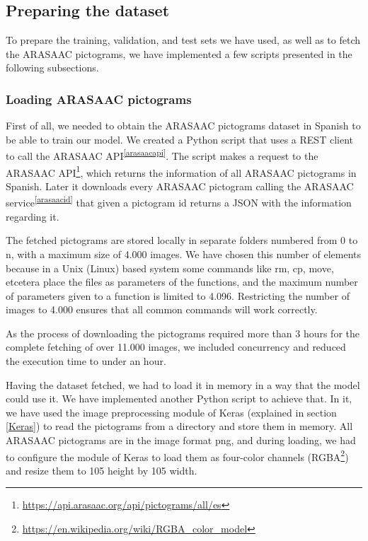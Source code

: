 \subsection{Preparing the dataset}
\label{Preparing the dataset}

To prepare the training, validation, and test sets we have used, as well as to fetch the ARASAAC pictograms, we have implemented a few scripts presented in the following subsections.

\subsubsection{Loading ARASAAC pictograms}
\label{Loading ARASAAC pictograms}

First of all, we needed to obtain the ARASAAC pictograms dataset in Spanish to be able to train our model. We created a Python script that uses a REST client to call the ARASAAC API\textsuperscript{\ref{arasaacapi}}. The script makes a request to the ARASAAC API\footnote{\href{https://api.arasaac.org/api/pictograms/all/es}{https://api.arasaac.org/api/pictograms/all/es}}, which returns the information of all ARASAAC pictograms in Spanish. Later it downloads every ARASAAC pictogram calling the ARASAAC service\textsuperscript{\ref{arasaacid}} that given a pictogram id returns a JSON with the information regarding it. 

The fetched pictograms are stored locally in separate folders numbered from 0 to n, with a maximum size of 4.000 images. We have chosen this number of elements because in a Unix (Linux) based system some commands like rm, cp, move, etcetera place the files as parameters of the functions, and the maximum number of parameters given to a function is limited to 4.096. Restricting the number of images to 4.000 ensures that all common commands will work correctly. 

As the process of downloading the pictograms required more than 3 hours for the complete fetching of over 11.000 images, we included concurrency and reduced the execution time to under an hour.

Having the dataset fetched, we had to load it in memory in a way that the model could use it. We have implemented another Python script to achieve that. In it, we have used the image preprocessing module of Keras (explained in section \ref{Keras}) to read the pictograms from a directory and store them in memory. All ARASAAC pictograms are in the image format png, and during loading, we had to configure the module of Keras to load them as four-color channels (RGBA\footnote{\href{https://en.wikipedia.org/wiki/RGBA_color_model}{https://en.wikipedia.org/wiki/RGBA\_color\_model}}) and resize them to 105 height by 105 width.

